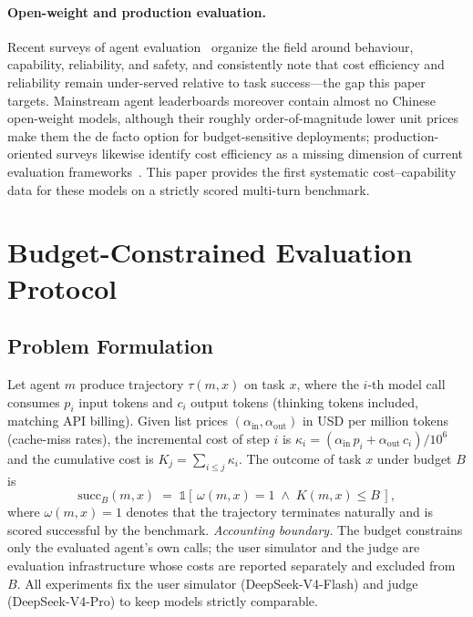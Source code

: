 \documentclass[preprint,authoryear,12pt]{elsarticle}
\begin{document}
\paragraph{Open-weight and production evaluation.} Recent surveys of agent evaluation~\cite{mohammadi2025evalsurvey,yehudai2025evalsurvey} organize the field around behaviour, capability, reliability, and safety, and consistently note that cost efficiency and reliability remain under-served relative to task success---the gap this paper targets. Mainstream agent leaderboards moreover contain almost no Chinese open-weight models, although their roughly order-of-magnitude lower unit prices make them the de facto option for budget-sensitive deployments; production-oriented surveys likewise identify cost efficiency as a missing dimension of current evaluation frameworks~\cite{mehta2025enterpriseagenticframework}. This paper provides the first systematic cost--capability data for these models on a strictly scored multi-turn benchmark.

\section{Budget-Constrained Evaluation Protocol}
\label{sec:protocol}

\subsection{Problem Formulation}
\label{subsec:problem-formulation}
Let agent $m$ produce trajectory $\tau(m,x)$ on task $x$, where the $i$-th model call consumes $p_i$ input tokens and $c_i$ output tokens (thinking tokens included, matching API billing). Given list prices $(\alpha_{\mathrm{in}}, \alpha_{\mathrm{out}})$ in USD per million tokens (cache-miss rates), the incremental cost of step $i$ is $\kappa_i = (\alpha_{\mathrm{in}}\, p_i + \alpha_{\mathrm{out}}\, c_i)/10^{6}$ and the cumulative cost is $K_j = \sum_{i \le j} \kappa_i$. The outcome of task $x$ under budget $B$ is
\begin{equation}
\mathrm{succ}_B(m,x) \;=\; \mathbb{1}\!\left[\,\omega(m,x)=1 \;\wedge\; K(m,x)\le B\,\right],
\end{equation}
where $\omega(m,x)=1$ denotes that the trajectory terminates naturally and is scored successful by the benchmark.
\emph{Accounting boundary.} The budget constrains only the evaluated agent's own calls; the user simulator and the judge are evaluation infrastructure whose costs are reported separately and excluded from $B$. All experiments fix the user simulator (DeepSeek-V4-Flash) and judge (DeepSeek-V4-Pro) to keep models strictly comparable.
\end{document}
